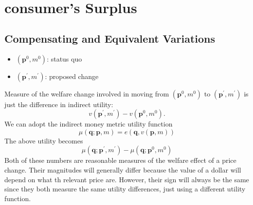 \chapter{consumer's Surplus}

\section{Compensating and Equivalent Variations}

\begin{itemize}
\item $(\mathbf{p}^0, m^0)$: status quo
\item $(\mathbf{p}^\prime, m^\prime)$: proposed change
\end{itemize}
Measure of the welfare change involved in moving from $(\mathbf{p}^0, m^0)$ to $(\mathbf{p}^\prime, m^\prime)$ is just the difference in indirect utility:
\[
    v(\mathbf{p}^\prime, m^\prime)-v(\mathbf{p}^0, m^0).
\]
We can adopt the indirect money metric utility function
\[
    \mu(\mathbf{q}; \mathbf{p}, m) = e(\mathbf{q}, v(\mathbf{p}, m))
\]
The above utility becomes
\[
    \mu(\mathbf{q}; \mathbf{p}^\prime, m^\prime)-
    \mu(\mathbf{q}; \mathbf{p}^0, m^0)
\]
Both of these numbers are reasonable measures of the welfare effect of a price change. Their magnitudes will generally differ because the value of a dollar will depend on what th relevant price are. However, their sign will always be the same since they both measure the same utility differences, just using a different utility function.

